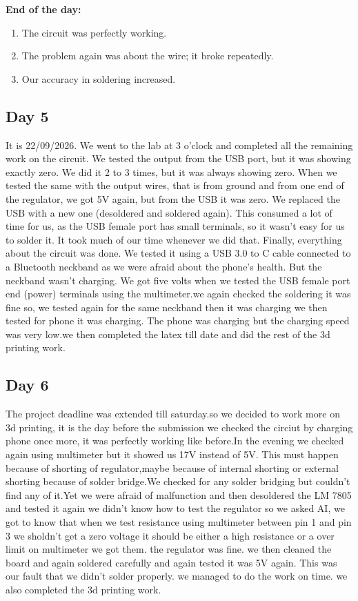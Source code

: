 \documentclass[11pt, a4paper]{article}
\begin{document}
\noindent\textbf{End of the day:}
\begin{enumerate}
    \item The circuit was perfectly working.
    \item The problem again was about the wire; it broke repeatedly.
    \item Our accuracy in soldering increased.
\end{enumerate}


\subsection*{Day 5}
It is 22/09/2026. We went to the lab at 3 o'clock and completed all the remaining work on the circuit. We tested the output from the USB port, but it was showing exactly zero. We did it 2 to 3 times, 
but it was always showing zero. When we tested the same with the output wires, that is from ground and from one end of the regulator, we got 5V again, but from the USB it was zero. We replaced the USB with a new one 
(desoldered and soldered again). This consumed a lot of time for us, as the USB female port has small terminals, so it wasn't easy for us to solder it. It took much of our time whenever we did that. Finally, 
everything about the circuit was done. We tested it using a USB 3.0 to C cable connected to a Bluetooth neckband as we were afraid about the phone's health. But the neckband wasn't charging. We got five volts when 
we tested the USB female port end (power) terminals using the multimeter.we again checked the soldering it was fine so, we tested again for the same neckband then it was charging we then tested for phone it was charging.
The phone was charging but the charging speed was very low.we then completed the latex till date and did the rest of the  3d printing work. 

\subsection*{Day 6}
The project deadline was extended till saturday.so we decided to work more on 3d printing, it is the day before the submission we checked the circiut by charging phone once more, it was perfectly working like before.In the evening 
we checked again using multimeter but it showed us 17V instead of 5V. This must happen because of shorting of regulator,maybe because of internal shorting or external shorting because of solder bridge.We checked for any solder bridging
but couldn't find any of it.Yet we were afraid of malfunction and then desoldered the LM 7805 and tested it again we didn't know how to test the regulator so we asked AI, we got to know that when we test resistance using multimeter between
pin 1 and pin 3 we sholdn't get a zero voltage it should be either a high resistance or a over limit on multimeter we got them. the regulator was fine. we then cleaned the board and again soldered carefully and again tested it was 5V again. 
This was our fault that we didn't solder properly. we managed to do the work on time. we also completed the 3d printing work.
\end{document}
